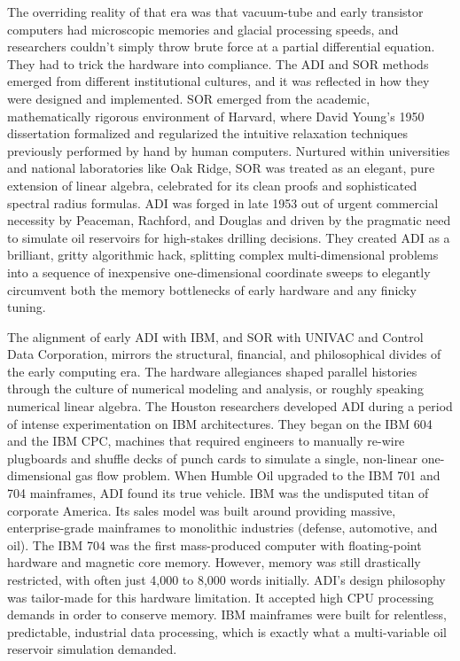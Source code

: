 The overriding reality of that era was that vacuum-tube and early transistor computers had microscopic memories and glacial processing speeds, and researchers couldn't simply throw brute force at a partial differential equation. They had to trick the hardware into compliance. The ADI and SOR methods emerged from different institutional cultures, and it was reflected in how they were designed and implemented. SOR emerged from the academic, mathematically rigorous environment of Harvard, where David Young’s 1950 dissertation formalized and regularized the intuitive relaxation techniques previously performed by hand by human computers. Nurtured within universities and national laboratories like Oak Ridge, SOR was treated as an elegant, pure extension of linear algebra, celebrated for its clean proofs and sophisticated spectral radius formulas. ADI was forged in late 1953 out of urgent commercial necessity by Peaceman, Rachford, and Douglas and driven by the pragmatic need to simulate oil reservoirs for high-stakes drilling decisions. They created ADI as a brilliant, gritty algorithmic hack, splitting complex multi-dimensional problems into a sequence of inexpensive one-dimensional coordinate sweeps to elegantly circumvent both the memory bottlenecks of early hardware and any finicky tuning.

The alignment of early ADI with IBM, and SOR with UNIVAC and Control Data Corporation, mirrors the structural, financial, and philosophical divides of the early computing era. The hardware allegiances shaped parallel histories through the culture of numerical modeling and analysis, or roughly speaking numerical linear algebra. The Houston researchers developed ADI during a period of intense experimentation on IBM architectures. They began on the IBM 604 and the IBM CPC, machines that required engineers to manually re-wire plugboards and shuffle decks of punch cards to simulate a single, non-linear one-dimensional gas flow problem. When Humble Oil upgraded to the IBM 701 and 704 mainframes, ADI found its true vehicle. IBM was the undisputed titan of corporate America. Its sales model was built around providing massive, enterprise-grade mainframes to monolithic industries (defense, automotive, and oil). The IBM 704 was the first mass-produced computer with floating-point hardware and magnetic core memory. However, memory was still drastically restricted, with often just 4,000 to 8,000 words initially. ADI’s design philosophy was tailor-made for this hardware limitation. It accepted high CPU processing demands in order to conserve memory. IBM mainframes were built for relentless, predictable, industrial data processing, which is exactly what a multi-variable oil reservoir simulation demanded.

